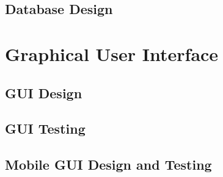 \documentclass[review]{cmpreport}
\begin{document}
	\subsection{Database Design}

	\section{Graphical User Interface}
	\subsection{GUI Design}
	\subsection{GUI Testing}
	\subsection{Mobile GUI Design and Testing}
	
	

\end{document}
